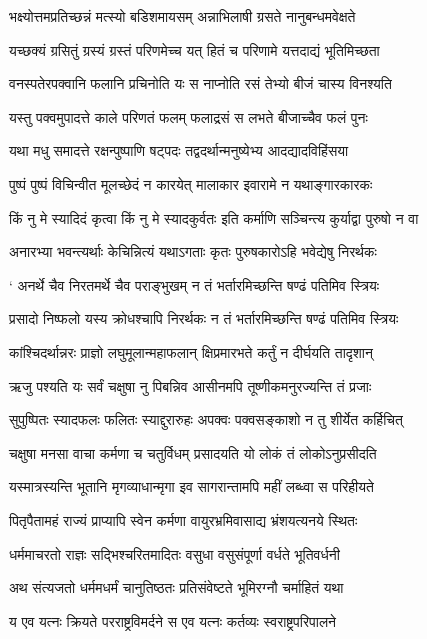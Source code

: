 \twolineshloka
{भक्ष्योत्तमप्रतिच्छन्नं मत्स्यो बडिशमायसम्}
{अन्नाभिलाषी ग्रसते नानुबन्धमवेक्षते}


\twolineshloka
{यच्छक्यं ग्रसितुं ग्रस्यं ग्रस्तं परिणमेच्च यत्}
{हितं च परिणामे यत्तदाद्यं भूतिमिच्छता}


\twolineshloka
{वनस्पतेरपक्वानि फलानि प्रचिनोति यः}
{स नाप्नोति रसं तेभ्यो बीजं चास्य विनश्यति}


\twolineshloka
{यस्तु पक्वमुपादत्ते काले परिणतं फलम्}
{फलाद्रसं स लभते बीजाच्चैव फलं पुनः}


\twolineshloka
{यथा मधु समादत्ते रक्षन्पुष्पाणि षट्पदः}
{तद्वदर्थान्मनुष्येभ्य आदद्यादविहिंसया}


\twolineshloka
{पुष्पं पुष्पं विचिन्वीत मूलच्छेदं न कारयेत्}
{मालाकार इवारामे न यथाङ्गारकारकः}


\twolineshloka
{किं नु मे स्यादिदं कृत्वा किं नु मे स्यादकुर्वतः}
{इति कर्माणि सञ्चिन्त्य कुर्याद्वा पुरुषो न वा}


\twolineshloka
{अनारभ्या भवन्त्यर्थाः केचिन्नित्यं यथाऽगताः}
{कृतः पुरुषकारोऽहि भवेद्येषु निरर्थकः}


\twolineshloka
{` अनर्थे चैव निरतमर्थे चैव पराङ्भुखम्}
{न तं भर्तारमिच्छन्ति षण्ढं पतिमिव स्त्रियः}


\twolineshloka
{प्रसादो निष्फलो यस्य क्रोधश्चापि निरर्थकः}
{न तं भर्तारमिच्छन्ति षण्ढं पतिमिव स्त्रियः}


\twolineshloka
{कांश्चिदर्थान्नरः प्राज्ञो लघुमूलान्महाफलान्}
{क्षिप्रमारभते कर्तुं न दीर्घयति तादृशान्}


\twolineshloka
{ऋजु पश्यति यः सर्वं चक्षुषा नु पिबन्निव}
{आसीनमपि तूष्णीकमनुरज्यन्ति तं प्रजाः}


\twolineshloka
{सुपुष्पितः स्यादफलः फलितः स्याद्दुरारुहः}
{अपक्वः पक्वसङ्काशो न तु शीर्येत कर्हिचित्}


\twolineshloka
{चक्षुषा मनसा वाचा कर्मणा च चतुर्विधम्}
{प्रसादयति यो लोकं तं लोकोऽनुप्रसीदति}


\twolineshloka
{यस्मात्रस्यन्ति भूतानि मृगव्याधान्मृगा इव}
{सागरान्तामपि महीं लब्ध्वा स परिहीयते}


\twolineshloka
{पितृपैतामहं राज्यं प्राप्यापि स्वेन कर्मणा}
{वायुरभ्रमिवासाद्य भ्रंशयत्यनये स्थितः}


\twolineshloka
{धर्ममाचरतो राज्ञः सद्भिश्चरितमादितः}
{वसुधा वसुसंपूर्णा वर्धते भूतिवर्धनी}


\threelineshloka
{अथ संत्यजतो धर्ममधर्मं चानुतिष्ठतः}
{प्रतिसंवेष्टते भूमिरग्नौ चर्माहितं यथा}
{}


\threelineshloka
{य एव यत्नः क्रियते परराष्ट्रविमर्दने}
{स एव यत्नः कर्तव्यः स्वराष्ट्रपरिपालने}
{}


